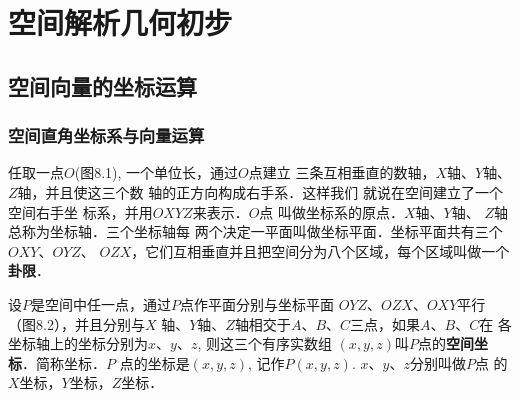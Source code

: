 
\chapter{空间解析几何初步}
\section{空间向量的坐标运算}
\subsection{空间直角坐标系与向量运算}
任取一点$O$(图8.1), 一个单位长，通过$O$点建立
三条互相垂直的数轴，$X$轴、$Y$轴、$Z$轴，并且使这三个数
轴的正方向构成右手系．这样我们
就说在空间建立了一个空间右手坐
标系，并用$OXYZ$来表示．$O$点
叫做坐标系的原点．$X$轴、$Y$轴、
$Z$轴总称为坐标轴．三个坐标轴每
两个决定一平面叫做坐标平面．坐标平面共有三个$OXY$、$OYZ$、
$OZX$，它们互相垂直并且把空间分为八个区域，每个区域叫做一个\textbf{卦限}．

\begin{figure}[htp]\centering
    \begin{minipage}[t]{0.48\textwidth}
    \centering
{}
    \caption{}
    \end{minipage}
    \begin{minipage}[t]{0.48\textwidth}
    \centering
    \caption{}
    \end{minipage}
    \end{figure}

设$P$是空间中任一点，通过$P$点作平面分别与坐标平面
$OYZ$、$OZX$、$OXY$平行（图8.2），并且分别与$X$
轴、$Y$轴、$Z$轴相交于$A$、$B$、$C$三点，如果$A$、$B$、$C$在
各坐标轴上的坐标分别为$x$、$y$、$z$, 则这三个有序实数组
$(x,y,z)$叫$P$点的\textbf{空间坐标}．简称坐标．$P$
点的坐标是$(x,y,z)$, 
记作$P(x,y,z)$. $x$、$y$、$z$分别叫做$P$点
的$X$坐标，$Y$坐标，$Z$坐标．

